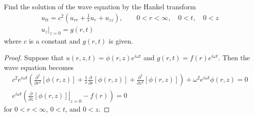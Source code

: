 \begin{problem}{2}
  Find the solution of the wave equation by the Hankel transform
  \begin{align*}
    &u_{tt} = c^2\left(u_{rr} + \frac{1}{r}u_r + u_{zz}\right), \qquad 0 < r < \infty, \quad 0 < t, \quad 0 < z\\
    &u_z\rvert_{z=0} = g(r,t)
  \end{align*}
  where $c$ is a constant and $g(r,t)$ is given.
\end{problem}

\begin{proof}
  Suppose that $u(r, z, t) = \phi(r, z) e^{i\omega t}$ and $g(r, t) = f(r) e^{i \omega t}$. Then the wave equation
  becomes
  \begin{align*}
    &c^2 e^{i \omega t} \left(\frac{\partial^2}{\partial r^2}\left[\phi(r, z)\right] + \frac{1}{r}\frac{\partial}{\partial r}\left[\phi(r, z)\right] + \frac{\partial^2}{\partial z^2}\left[\phi(r, z)\right]\right) + \omega^2 e^{i \omega t} \phi(r, z) = 0 \\
    &e^{i\omega t}\left(\left.\frac{\partial}{\partial z}\left[\phi(r,z)\right]\right\rvert_{z=0}- f(r)\right) = 0
  \end{align*}
  for $0 < r < \infty$, $0 < t$, and  $0 < z$.


\end{proof}
